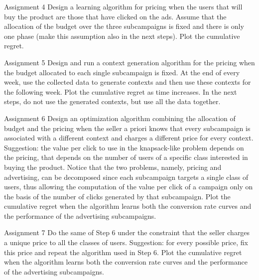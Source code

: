 \documentclass[11pt]{beamer}
\begin{document}
\begin{frame}{Assignment 4}
Design a learning algorithm for pricing when the users that will buy the product are those that have clicked on the ads. Assume that the allocation of the budget over the three subcampaigns is fixed and there is only one phase (make this assumption also in the next steps). Plot the cumulative regret.
\end{frame}

\begin{frame}{Assignment 5}
Design and run a context generation algorithm for the pricing when the budget allocated to each single subcampaign is fixed. At the end of every week, use the collected data to generate contexts and then use these contexts for the following week. Plot the cumulative regret as time increases. In the next steps, do not use the generated contexts, but use all the data together.
\end{frame}

\begin{frame}{Assignment 6}
Design an optimization algorithm combining the allocation of budget and the pricing when the seller a priori knows that every subcampaign is associated with a different context and charges a different price for every context. Suggestion: the value per click to use in the knapsack-like problem depends on the pricing, that depends on the number of users of a specific class interested in buying the product. Notice that the two problems, namely, pricing and advertising, can be decomposed since each subcampaign targets a single class of users, thus allowing the computation of the value per click of a campaign only on the basis of the number of clicks generated by that subcampaign. Plot the cumulative regret when the algorithm learns both the conversion rate curves and the performance of the advertising subcampaigns.
\end{frame}

\begin{frame}{Assignment 7}
Do the same of Step 6 under the constraint that the seller charges a unique price to all the classes of users. Suggestion: for every possible price, fix this price and repeat the algorithm used in Step 6. Plot the cumulative regret when the algorithm learns both the conversion rate curves and the performance of the advertising subcampaigns.
\end{frame}
\end{document}
